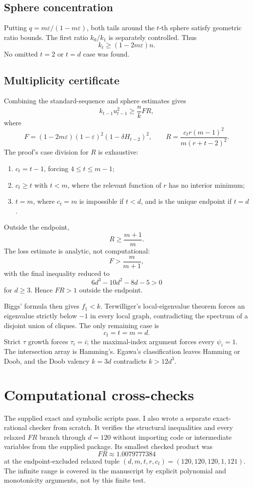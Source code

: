 \documentclass[11pt]{article}
\newcommand{\eps}{\varepsilon}
\begin{document}
\subsection{Sphere concentration}
Putting $q=m\eps/(1-m\eps)$, both tails around the $t$-th sphere satisfy geometric ratio bounds.  The first ratio $k_0/k_1$ is separately controlled.  Thus
\[
 k_t\ge(1-2m\eps)n.
\]
No omitted $t=2$ or $t=d$ case was found.

\subsection{Multiplicity certificate}
Combining the standard-sequence and sphere estimates gives
\[
 k_{t-1}u_{t-1}^2\ge\frac{n}{k}FR,
\]
where
\[
 F=(1-2m\eps)(1-\eps)^2(1-\delta H_{t-2})^2,
 \qquad
 R=\frac{c_t r(m-1)^2}{m(r+t-2)^2}.
\]
The proof's case division for $R$ is exhaustive:
\begin{enumerate}[leftmargin=2em,itemsep=0.25em]
\item $c_t=t-1$, forcing $4\le t\le m-1$;
\item $c_t\ge t$ with $t<m$, where the relevant function of $r$ has no interior minimum;
\item $t=m$, where $c_t=m$ is impossible if $t<d$, and is the unique endpoint if $t=d$.
\end{enumerate}
Outside the endpoint,
\[
 R\ge\frac{m+1}{m}.
\]
The loss estimate is analytic, not computational:
\[
 F>\frac{m}{m+1},
\]
with the final inequality reduced to
\[
 6d^3-10d^2-8d-5>0
\]
for $d\ge3$.  Hence $FR>1$ outside the endpoint.

Biggs' formula then gives $f_1<k$.  Terwilliger's local-eigenvalue theorem forces an eigenvalue strictly below $-1$ in every local graph, contradicting the spectrum of a disjoint union of cliques.  The only remaining case is
\[
 c_t=t=m=d.
\]
Strict $\tau$ growth forces $\tau_i=i$; the maximal-index argument forces every $\psi_i=1$.  The intersection array is Hamming's.  Egawa's classification leaves Hamming or Doob, and the Doob valency $k=3d$ contradicts $k>12d^3$.

\section{Computational cross-checks}
The supplied exact and symbolic scripts pass.  I also wrote a separate exact-rational checker from scratch.  It verifies the structural inequalities and every relaxed $F R$ branch through $d=120$ without importing code or intermediate variables from the supplied package.  Its smallest checked product was
\[
 FR\approx1.0079777384
\]
at the endpoint-excluded relaxed tuple $(d,m,t,r,c_t)=(120,120,120,1,121)$.  The infinite range is covered in the manuscript by explicit polynomial and monotonicity arguments, not by this finite test.
\end{document}

